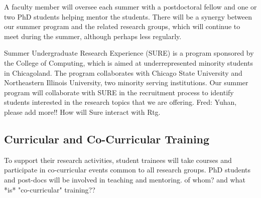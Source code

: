 \documentclass[11pt]{NSFamsart}
\newcommand{\FredNote}[1]{{\color{blue} Fred: #1}}
\begin{document}
A faculty member will oversee each summer with a postdoctoral fellow and one or two PhD students helping mentor the students.  There will be a synergy between our summer program and the related research groups, which will continue to meet during the summer, although perhaps less regularly.

Summer Undergraduate Research Experience (SURE) is a program sponsored by the College of Computing, which is aimed at underrepresented minority students in Chicagoland.  The program collaborates with Chicago State University and Northeastern Illinois University, two minority serving institutions.  Our summer program will collaborate with SURE in the recruitment process to identify students interested in the research topics that we are offering. \FredNote{Yuhan, please add more!! How will Sure interact with Rtg.}
 
 




\subsection{Curricular and Co-Curricular Training}
To support their research activities, student trainees will take courses and participate in co-curricular events common to all research groups.  PhD students and post-docs will be involved in teaching and mentoring. {\color{magenta}of whom? and what *is* "co-curricular" training??} 
\end{document}
